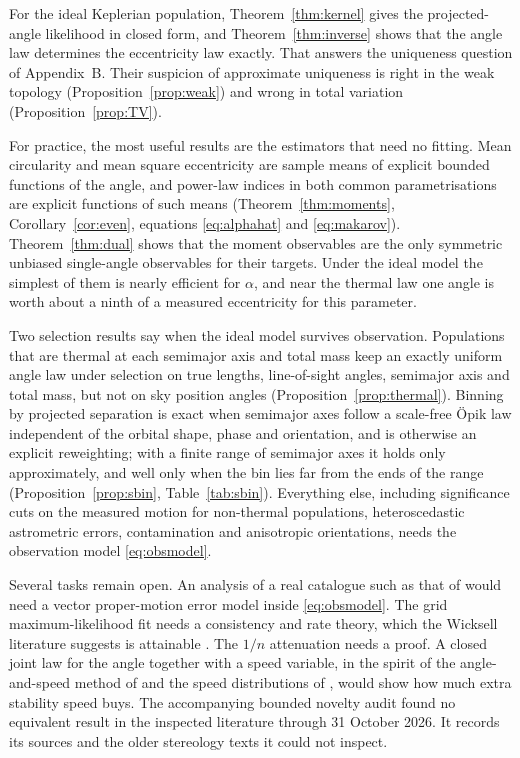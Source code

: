 \documentclass[11pt,a4paper]{article}
\theoremstyle{remark}\newtheorem{remark}[theorem]{Remark}
\begin{document}
For the ideal Keplerian population, Theorem~\ref{thm:kernel} gives the projected-angle likelihood in closed form, and Theorem~\ref{thm:inverse} shows that the angle law determines the eccentricity law exactly. That answers the uniqueness question of \citet{Hwang2022} Appendix~B. Their suspicion of approximate uniqueness is right in the weak topology (Proposition~\ref{prop:weak}) and wrong in total variation (Proposition~\ref{prop:TV}).

For practice, the most useful results are the estimators that need no fitting. Mean circularity and mean square eccentricity are sample means of explicit bounded functions of the angle, and power-law indices in both common parametrisations are explicit functions of such means (Theorem~\ref{thm:moments}, Corollary~\ref{cor:even}, equations \eqref{eq:alphahat} and \eqref{eq:makarov}). Theorem~\ref{thm:dual} shows that the moment observables are the only symmetric unbiased single-angle observables for their targets. Under the ideal model the simplest of them is nearly efficient for $\alpha$, and near the thermal law one angle is worth about a ninth of a measured eccentricity for this parameter.

Two selection results say when the ideal model survives observation. Populations that are thermal at each semimajor axis and total mass keep an exactly uniform angle law under selection on true lengths, line-of-sight angles, semimajor axis and total mass, but not on sky position angles (Proposition~\ref{prop:thermal}). Binning by projected separation is exact when semimajor axes follow a scale-free \"Opik law independent of the orbital shape, phase and orientation, and is otherwise an explicit reweighting; with a finite range of semimajor axes it holds only approximately, and well only when the bin lies far from the ends of the range (Proposition~\ref{prop:sbin}, Table~\ref{tab:sbin}). Everything else, including significance cuts on the measured motion for non-thermal populations, heteroscedastic astrometric errors, contamination and anisotropic orientations, needs the observation model \eqref{eq:obsmodel}.

Several tasks remain open. An analysis of a real catalogue such as that of \citet{ElBadry2021} would need a vector proper-motion error model inside \eqref{eq:obsmodel}. The grid maximum-likelihood fit needs a consistency and rate theory, which the Wicksell literature suggests is attainable \citep{GroeneboomJongbloed1995}. The $1/n$ attenuation needs a proof. A closed joint law for the angle together with a speed variable, in the spirit of the angle-and-speed method of \citet{TokovininKiyaeva2016} and the speed distributions of \citet{Benisty2022}, would show how much extra stability speed buys. The accompanying bounded novelty audit found no equivalent result in the inspected literature through 31 October 2026. It records its sources and the older stereology texts it could not inspect.
\end{document}
